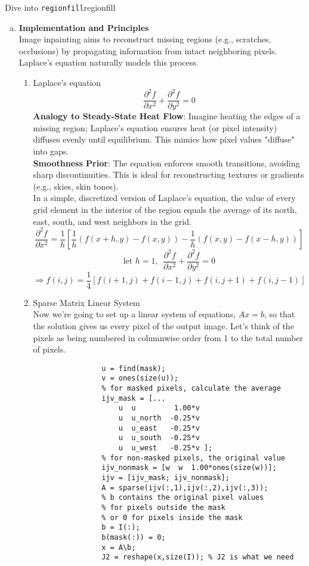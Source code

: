 \begin{problem}{Dive into \texttt{regionfill}}{regionfill}
\begin{enumerate}[(a)]
    \item \textbf{Implementation and Principles}\cite{Eddins2015}\\
        Image inpainting aims to reconstruct missing regions (e.g., scratches, occlusions) by propagating information from intact neighboring pixels. Laplace's equation naturally models this process.
        \begin{enumerate}[label = (\roman*)]
            \item Laplace's equation
                $$\frac{\partial^2 f}{\partial x^2} + \frac{\partial^2 f}{\partial y^2} = 0$$
                \textbf{Analogy to Steady-State Heat Flow}: Imagine heating the edges of a missing region; Laplace's equation ensures heat (or pixel intensity) diffuses evenly until equilibrium. This mimics how pixel values "diffuse" into gaps.\\
                \textbf{Smoothness Prior}: The equation enforces smooth transitions, avoiding sharp discontinuities. This is ideal for reconstructing textures or gradients (e.g., skies, skin tones).\\
                In a simple, discretized version of Laplace's equation, the value of every grid element in the interior of the region equals the average of its north, east, south, and west neighbors in the grid.
                $$\frac{\partial^2 f}{\partial x^2} = \frac{1}{h}[\frac{1}{h}(f(x+h,y)-f(x,y))-\frac{1}{h}(f(x,y)-f(x-h,y))]$$
                $$\text{let }h=1, \ \ \frac{\partial^2 f}{\partial x^2} + \frac{\partial^2 f}{\partial y^2} = 0$$
                $$\Rightarrow f(i,j) = \frac{1}{4}[f(i+1,j) + f(i-1,j) + f(i,j+1) + f(i,j-1)]$$
            \item Sparse Matrix Linear System\\
            Now we're going to set up a linear system of equations, $Ax=b$, so that the solution gives us every pixel of the output image. Let's think of the pixels as being numbered in columnwise order from 1 to the total number of pixels.
                \begin{verbatim}
                u = find(mask);
                v = ones(size(u));
                % for masked pixels, calculate the average
                ijv_mask = [...
                    u  u         1.00*v
                    u  u_north  -0.25*v
                    u  u_east   -0.25*v
                    u  u_south  -0.25*v
                    u  u_west   -0.25*v ];
                % for non-masked pixels, the original value
                ijv_nonmask = [w  w  1.00*ones(size(w))];
                ijv = [ijv_mask; ijv_nonmask];
                A = sparse(ijv(:,1),ijv(:,2),ijv(:,3));
                % b contains the original pixel values 
                % for pixels outside the mask
                % or 0 for pixels inside the mask
                b = I(:);
                b(mask(:)) = 0; 
                x = A\b;
                J2 = reshape(x,size(I)); % J2 is what we need
                \end{verbatim}
            

\end{enumerate}
\end{enumerate}
\end{problem}
